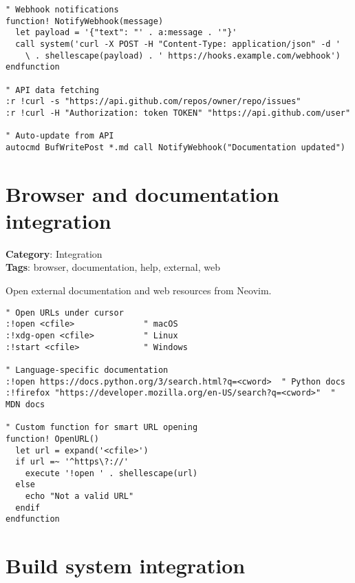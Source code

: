 {{{{{\begin{Exa*}{}
\begin{Verbatim}[fontsize=\footnotesize, breaklines, breakanywhere]
" Webhook notifications
function! NotifyWebhook(message)
  let payload = '{"text": "' . a:message . '"}'
  call system('curl -X POST -H "Content-Type: application/json" -d ' 
    \ . shellescape(payload) . ' https://hooks.example.com/webhook')
endfunction

" API data fetching
:r !curl -s "https://api.github.com/repos/owner/repo/issues"
:r !curl -H "Authorization: token TOKEN" "https://api.github.com/user"

" Auto-update from API
autocmd BufWritePost *.md call NotifyWebhook("Documentation updated")
\end{Verbatim}
\end{Exa*}

\section{Browser and documentation integration}

\textbf{Category}: Integration\\ \textbf{Tags}: browser, documentation, help, external, web
\vspace{0.5cm}

Open external documentation and web resources from Neovim.

\begin{Exa*}{}
\begin{Verbatim}[fontsize=\footnotesize, breaklines, breakanywhere]
" Open URLs under cursor
:!open <cfile>              " macOS
:!xdg-open <cfile>          " Linux
:!start <cfile>             " Windows

" Language-specific documentation
:!open https://docs.python.org/3/search.html?q=<cword>  " Python docs
:!firefox "https://developer.mozilla.org/en-US/search?q=<cword>"  " MDN docs

" Custom function for smart URL opening
function! OpenURL()
  let url = expand('<cfile>')
  if url =~ '^https\?://'
    execute '!open ' . shellescape(url)
  else
    echo "Not a valid URL"
  endif
endfunction
\end{Verbatim}
\end{Exa*}

\section{Build system integration}

}}}}}

